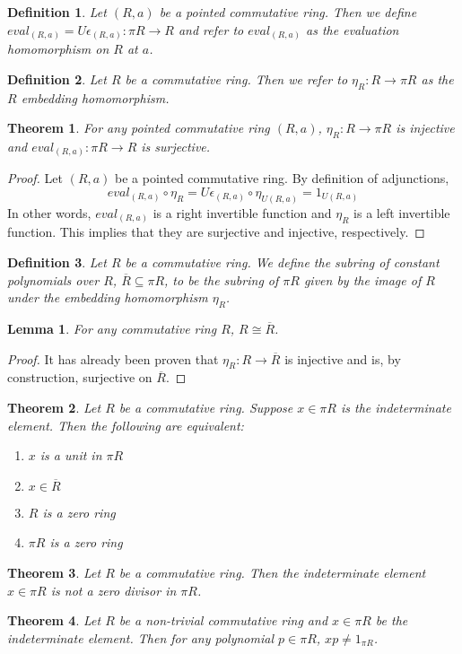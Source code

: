 \documentclass[12pt]{article}
\newtheorem{defn}{Definition}
\newtheorem{lem}{Lemma}
\newtheorem{thm}{Theorem}
\begin{document}
\begin{defn}
  Let $(R,a)$ be a pointed commutative ring. Then we define $eval_{(R,a)}=U\epsilon_{(R,a)}:\pi R \to R$ and refer to $eval_{(R,a)}$ as the evaluation homomorphism on $R$ at $a$.
\end{defn}

\begin{defn}
  Let $R$ be a commutative ring. Then we refer to $\eta_{R}:R\to\pi R$ as the $R$ embedding homomorphism.
\end{defn}

\begin{thm}
  For any pointed commutative ring $(R,a)$, $\eta_{R}:R\to\pi R$ is injective and $eval_{(R,a)}:\pi R\to R$ is surjective.
\end{thm}

\begin{proof}
  Let $(R,a)$ be a pointed commutative ring. By definition of adjunctions, $$eval_{(R,a)}\circ\eta_{R} = U\epsilon_{(R,a)}\circ\eta_{U(R,a)} = 1_{U(R,a)}$$ In other words, $eval_{(R,a)}$ is a right invertible function and $\eta_{R}$ is a left invertible function. This implies that they are surjective and injective, respectively.
\end{proof}

\begin{defn}
  Let $R$ be a commutative ring. We define the subring of constant polynomials over $R$, $\overline{R}\subseteq\pi R$, to be the subring of $\pi R$ given by the image of $R$ under the embedding homomorphism $\eta_R$.
\end{defn}

\begin{lem}
  For any commutative ring $R$, $R \cong \overline{R}$.
\end{lem}

\begin{proof}
  It has already been proven that $\eta_R:R\to\overline{R}$ is injective and is, by construction, surjective on $\overline{R}$.
\end{proof}

\begin{thm}
  Let $R$ be a commutative ring. Suppose $x\in\pi R$ is the indeterminate element. Then the following are equivalent:
  \begin{enumerate}
    \item $x$ is a unit in $\pi R$
    \item $x\in\overline{R}$
    \item $R$ is a zero ring
    \item $\pi R$ is a zero ring
  \end{enumerate}
\end{thm}

\begin{thm}
  Let $R$ be a commutative ring. Then the indeterminate element $x\in\pi R$ is not a zero divisor in $\pi R$.
\end{thm}

\begin{thm}
  Let $R$ be a non-trivial commutative ring and $x\in\pi R$ be the indeterminate element. Then for any polynomial $p\in\pi R$, $xp \neq 1_{\pi R}$.  
\end{thm}
\end{document}
